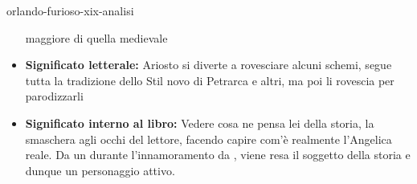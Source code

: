 \documentclass[preview]{standalone}
\begin{document}
\begin{snippet}{orlando-furioso-xix-analisi}
\begin{itemize}
        maggiore di quella medievale
        \item \textbf{Significato letterale:} Ariosto si diverte a rovesciare alcuni schemi, segue tutta la tradizione
        dello Stil novo di Petrarca e altri, ma poi li rovescia per parodizzarli
        \item \textbf{Significato interno al libro:} Vedere cosa ne pensa lei della storia, la smaschera agli occhi del
        lettore, facendo capire com'è realmente l'Angelica reale.
        Da un  durante l'innamoramento da ,
        viene resa il soggetto della storia e dunque un personaggio attivo.
    \end{itemize}
\end{snippet}
\end{document}
